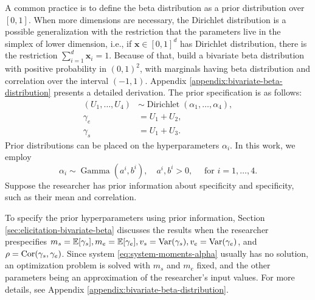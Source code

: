 A common practice is to define the beta distribution as a prior distribution
over $[0,1]$. When more dimensions are necessary, the Dirichlet distribution
is a possible generalization with the restriction that the parameters live in
the simplex of lower dimension, i.e., if $\boldsymbol{x} \in [0,1]^d$ has Dirichlet
distribution, there is the restriction $\sum_{i=1}^d \boldsymbol{x}_i = 1$.
Because of that, \textcite{olkin2015constructions} build a bivariate beta distribution
with positive probability in $(0,1)^2$, with marginals having beta
distribution and correlation over the interval $(-1,1)$. Appendix
\ref{appendix:bivariate-beta-distribution} presents a detailed derivation. The
prior specification is as follows:
\begin{equation*}
  \begin{aligned}
    (U_1, \dots, U_4) & \sim \operatorname{Dirichlet}(\alpha_1, \dots, \alpha_4), \\
    \gamma_e          & = U_1 + U_2,                                              \\
    \gamma_s          & = U_1 + U_3.
  \end{aligned}
\end{equation*}
Prior distributions can be placed on the hyperparameters $\alpha_i$. In this work,
we employ
\begin{equation*}
  \alpha_i \sim \operatorname{Gamma}(a^i, b^i), \quad a^i, b^i > 0, \quad \text{ for } i = 1,\dots,4.
\end{equation*}
Suppose the researcher has prior information about specificity and specificity,
such as their mean and correlation.

To specify the prior hyperparameters using prior information, Section
\ref{sec:elicitation-bivariate-beta} discusses the results when the
researcher prespecifies $m_s = \mathbb{E}[\gamma_s], m_e = \mathbb{E}[\gamma_e], v_s = \operatorname{Var}(\gamma_s),
  v_e = \operatorname{Var}(\gamma_e)$, and $\rho  = \operatorname{Cor}(\gamma_s, \gamma_e)$. Since system
\eqref{eq:system-moments-alpha} usually has no solution, an optimization
problem is solved with $m_s$ and $m_e$ fixed, and the other parameters being
an approximation of the researcher's input values. For more details, see Appendix \ref{appendix:bivariate-beta-distribution}.

